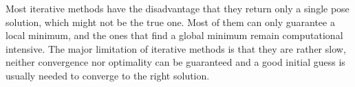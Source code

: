 \documentclass[letterpaper, 10 pt, conference]{ieeeconf}  %
\begin{document}
	
	
	
	
	
	Most iterative methods have the disadvantage that they return only a single pose solution, which might not be the true one. Most of them can only guarantee a local minimum, and the ones that find a global minimum remain computational intensive. The major limitation of iterative methods is that they are rather slow, neither convergence nor optimality can be guaranteed and a good initial guess is usually needed to converge to the right solution.
	
\end{document}

